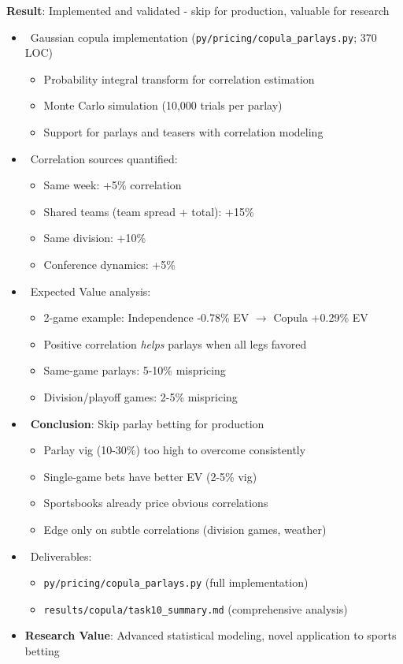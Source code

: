 \textbf{Result}: Implemented and validated - skip for production, valuable for research

\begin{itemize}
  \item \done\ Gaussian copula implementation (\texttt{py/pricing/copula\_parlays.py}; 370 LOC)
  \begin{itemize}
    \item Probability integral transform for correlation estimation
    \item Monte Carlo simulation (10,000 trials per parlay)
    \item Support for parlays and teasers with correlation modeling
  \end{itemize}
  \item \done\ Correlation sources quantified:
  \begin{itemize}
    \item Same week: +5\% correlation
    \item Shared teams (team spread + total): +15\%
    \item Same division: +10\%
    \item Conference dynamics: +5\%
  \end{itemize}
  \item \done\ Expected Value analysis:
  \begin{itemize}
    \item 2-game example: Independence -0.78\% EV $\to$ Copula +0.29\% EV
    \item Positive correlation \textit{helps} parlays when all legs favored
    \item Same-game parlays: 5-10\% mispricing
    \item Division/playoff games: 2-5\% mispricing
  \end{itemize}
  \item \done\ \textbf{Conclusion}: Skip parlay betting for production
  \begin{itemize}
    \item Parlay vig (10-30\%) too high to overcome consistently
    \item Single-game bets have better EV (2-5\% vig)
    \item Sportsbooks already price obvious correlations
    \item Edge only on subtle correlations (division games, weather)
  \end{itemize}
  \item \done\ Deliverables:
  \begin{itemize}
    \item \texttt{py/pricing/copula\_parlays.py} (full implementation)
    \item \texttt{results/copula/task10\_summary.md} (comprehensive analysis)
  \end{itemize}
  \item \textbf{Research Value}: Advanced statistical modeling, novel application to sports betting
\end{itemize}

